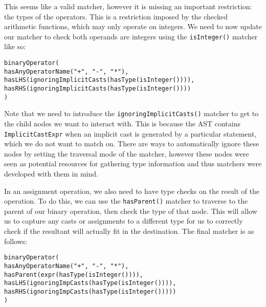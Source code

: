 This seems like a valid matcher, however it is missing an important restriction: the types of the operators. This is a restriction imposed by the checked arithmetic functions, which may only operate on integers. We need to now update our matcher to check both operands are integers using the \texttt{isInteger()} matcher like so:
\begin{center}
\parbox{0.9\linewidth}{
\texttt{binaryOperator(\\
\hspace*{4em}hasAnyOperatorName("+", "-", "*"),\\
\hspace*{4em}hasLHS(ignoringImplicitCasts(hasType(isInteger()))),\\
\hspace*{4em}hasRHS(ignoringImplicitCasts(hasType(isInteger())))\\
)}
}
\end{center}

Note that we need to introduce the \texttt{ignoringImplicitCasts()} matcher to get to the child nodes we want to interact with. This is because the AST contains \texttt{ImplicitCastExpr} when an implicit cast is generated by a particular statement, which we do not want to match on. There are ways to automatically ignore these nodes by setting the traversal mode of the matcher, however these nodes were seen as potential resources for gathering type information and thus matchers were developed with them in mind.

In an assignment operation, we also need to have type checks on the result of the operation. To do this, we can use the \texttt{hasParent()} matcher to traverse to the parent of our binary operation, then check the type of that node. This will allow us to capture any casts or assignments to a different type for us to correctly check if the resultant will actually fit in the destination. The final matcher is as follows:
\begin{center}
\parbox{0.9\linewidth}{
\texttt{binaryOperator(\\
\hspace*{4em}hasAnyOperatorName("+", "-", "*"),\\
\hspace*{4em}hasParent(expr(hasType(isInteger()))),\\
\hspace*{4em}hasLHS(ignoringImpCasts(hasType(isInteger()))),\\
\hspace*{4em}hasRHS(ignoringImpCasts(hasType(isInteger()))))\\
)}
}
\end{center}

